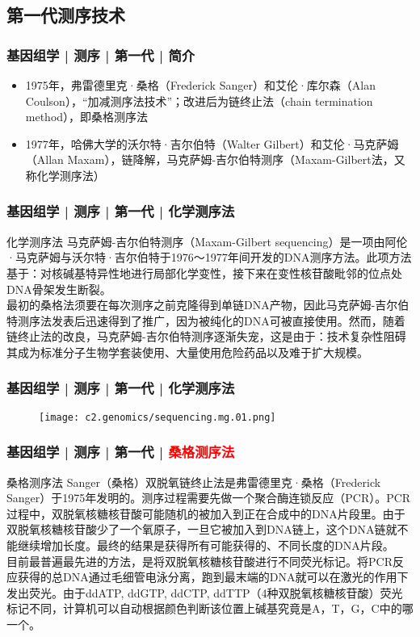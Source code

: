 \subsection{第一代测序技术}
\begin{frame}
  \frametitle{基因组学 | 测序 | 第一代 | 简介}
   \begin{itemize}
     \item 1975年，弗雷德里克·桑格（Frederick Sanger）和艾伦·库尔森（Alan Coulson），“加减测序法技术”；改进后为链终止法（chain termination method），即桑格测序法
     \item 1977年，哈佛大学的沃尔特·吉尔伯特（Walter Gilbert）和艾伦·马克萨姆（Allan Maxam），链降解，马克萨姆-吉尔伯特测序（Maxam-Gilbert法，又称化学测序法）
   \end{itemize} 
\end{frame}

\begin{frame}
  \frametitle{基因组学 | 测序 | 第一代 | 化学测序法}
  \begin{block}{化学测序法}
马克萨姆-吉尔伯特测序（Maxam-Gilbert sequencing）是一项由阿伦·马克萨姆与沃尔特·吉尔伯特于1976～1977年间开发的DNA测序方法。此项方法基于：对核碱基特异性地进行局部化学变性，接下来在变性核苷酸毗邻的位点处DNA骨架发生断裂。\\
\vspace{1em}
最初的桑格法须要在每次测序之前克隆得到单链DNA产物，因此马克萨姆-吉尔伯特测序法发表后迅速得到了推广，因为被纯化的DNA可被直接使用。然而，随着链终止法的改良，马克萨姆-吉尔伯特测序逐渐失宠，这是由于：技术复杂性阻碍其成为标准分子生物学套装使用、大量使用危险药品以及难于扩大规模。
  \end{block}
\end{frame}

\begin{frame}
  \frametitle{基因组学 | 测序 | 第一代 | 化学测序法}
  \begin{figure}
    \centering
    \texttt{[image: c2.genomics/sequencing.mg.01.png]}
  \end{figure}
\end{frame}

\begin{frame}
  \frametitle{基因组学 | 测序 | 第一代 | \textcolor{red}{桑格测序法}}
  \begin{block}{桑格测序法}
Sanger（桑格）双脱氧链终止法是弗雷德里克·桑格（Frederick Sanger）于1975年发明的。测序过程需要先做一个聚合酶连锁反应（PCR）。PCR过程中，双脱氧核糖核苷酸可能随机的被加入到正在合成中的DNA片段里。由于双脱氧核糖核苷酸少了一个氧原子，一旦它被加入到DNA链上，这个DNA链就不能继续增加长度。最终的结果是获得所有可能获得的、不同长度的DNA片段。\\
\vspace{1em}
目前最普遍最先进的方法，是将双脱氧核糖核苷酸进行不同荧光标记。将PCR反应获得的总DNA通过毛细管电泳分离，跑到最末端的DNA就可以在激光的作用下发出荧光。由于ddATP, ddGTP, ddCTP, ddTTP（4种双脱氧核糖核苷酸）荧光标记不同，计算机可以自动根据颜色判断该位置上碱基究竟是A，T，G，C中的哪一个。 
  \end{block}
\end{frame}

